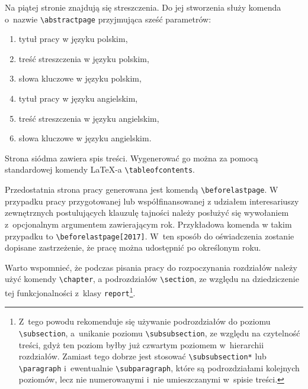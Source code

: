 \documentclass{SGGW-thesis}
\begin{document}
Na piątej stronie znajdują się streszczenia. Do jej stworzenia służy komenda o~nazwie \verb|\abstractpage| przyjmująca sześć parametrów:
\begin{enumerate}
\item{tytuł pracy w języku polskim,}
\item{treść streszczenia w języku polskim,}
\item{słowa kluczowe w języku polskim,}
\item{tytuł pracy w języku angielskim,}
\item{treść streszczenia w języku angielskim,}
\item{słowa kluczowe w języku angielskim.}
\end{enumerate}
Strona siódma zawiera spis treści. Wygenerować go można za pomocą standardowej komendy \LaTeX-a \verb|\tableofcontents|.

Przedostatnia strona pracy generowana jest komendą \verb|\beforelastpage|. \linebreak W przypadku pracy przygotowanej lub współfinansowanej z udziałem interesariuszy zewnętrznych
postulujących klauzulę tajności należy posłużyć się wywołaniem z~opcjonalnym argumentem zawierającym rok. Przykładowa komenda w takim przypadku to
\verb|\beforelastpage[2017]|. W~ten sposób do oświadczenia zostanie dopisane zastrzeżenie, że pracę można udostępnić po określonym roku.

Warto wspomnieć, że podczas pisania pracy do rozpoczynania rozdziałów należy użyć komendy \verb|\chapter|, a podrozdziałów \verb|\section|, ze względu na dziedziczenie tej
funkcjonalności z~klasy \verb|report|\footnote{\label{not:subsubsection}Z~tego powodu rekomenduje się używanie podrozdziałów do poziomu {\tt \textbackslash{}subsection}, a~unikanie poziomu {\tt \textbackslash{}subsubsection}, ze względu na czytelność treści, gdyż ten poziom byłby już czwartym poziomem w~hierarchii rozdziałów. Zamiast tego dobrze jest stosować {\tt \textbackslash{}subsubsection*} lub {\tt \textbackslash{}paragraph} i~ewentualnie {\tt \textbackslash{}subparagraph}, które są podrozdziałami kolejnych poziomów, lecz nie numerowanymi i~nie umieszczanymi w~spisie treści.}.
\end{document}
